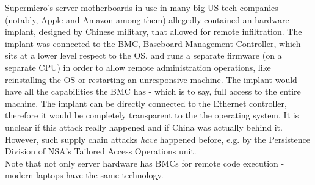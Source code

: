 \documentclass[11pt,oneside,a4paper]{article}
\begin{document}
Supermicro’s server motherboards in use in many big US tech companies (notably, Apple and Amazon
among them) allegedly contained an hardware implant, designed by Chinese military, that allowed for remote infiltration. The implant was connected to the BMC, Baseboard Management Controller, which sits at a lower level respect to the OS, and runs a separate firmware (on a separate CPU) in order to allow remote administration operations, like reinstalling the OS or restarting an unresponsive machine. The implant would have all the capabilities the BMC has - which is to say, full access to the entire machine. The implant can be directly connected to the Ethernet controller, therefore it would be completely transparent to the the operating system. It is unclear if this attack really happened and if China was actually behind it. However, such supply chain attacks \textit{have} happened before, e.g. by the Persistence Division of NSA’s Tailored Access Operations unit.\\
Note that not only server hardware has BMCs for remote code execution - modern laptops have the same technology.





\label{lastpage} %
\clearpage
{}



\clearpage
\appendix
{}
\end{document}
